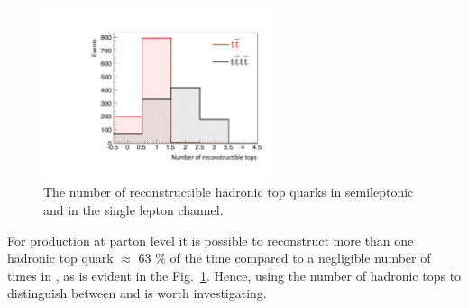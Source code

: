 \begin{figure}[!ht]
\centering
    \includegraphics[width=0.6\textwidth]{images/Run1/HadRecoTops.pdf}
    \caption{The number of reconstructible hadronic top quarks in semileptonic \ttbar and \tttt in the single lepton channel.}
    \label{fig:ReconHadTops}
\end{figure}

For \tttt production at parton level it is possible to reconstruct more than one hadronic top quark $\approx$ 63 $\%$ of the time compared to a negligible number of times in \ttbar, as is evident in the Fig.~\ref{fig:ReconHadTops}. Hence, using the number of hadronic tops to distinguish between \tttt and \ttbar is worth investigating. 


